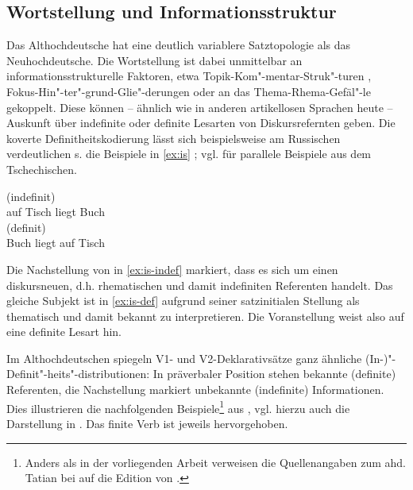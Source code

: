 \subsection{Wortstellung und Informationsstruktur} \label{is-ahd.}

Das Althochdeutsche hat eine deutlich variablere Satztopologie als das Neuhochdeutsche. Die Wortstellung ist dabei unmittelbar an informationsstrukturelle Faktoren, etwa  Topik-Kom"-mentar-Struk"-turen
\parencite{Hinterholzl2005,Ramers2005,Solf2008}, Fokus-Hin"-ter"-grund-Glie"-derungen \parencite{Petrova2009} oder an das Thema-Rhema-Gefäl"-le \parencite{Leiss2000} gekoppelt. Diese können -- ähnlich wie in anderen artikellosen Sprachen heute -- Auskunft über indefinite oder definite Lesarten von Diskursrefernten geben. Die koverte Definitheitskodierung lässt sich beispielsweise am Russischen verdeutlichen s. die Beispiele in \ref{ex:is} \parencite[s.][191]{Szczepaniak2015};  vgl.  \textcite[5]{Leiss2000} für parallele Beispiele aus dem Tschechischen. 

\begin{exe}
	\ex \label{ex:is}   
	\begin{xlist}
		\ex \label{ex:is-indef} 
		\gll {}    (indefinit) \\
		auf Tisch liegt Buch\\
		\trans {}
		\ex \label{ex:is-def} 
		\gll {}    (definit) \\
		Buch liegt auf Tisch\\
		\trans {}
	\end{xlist}
\end{exe}

\noindent
Die Nachstellung von  in \ref{ex:is-indef} markiert, dass es sich um einen diskursneuen, d.h. rhematischen und damit indefiniten Referenten handelt. Das gleiche Subjekt ist in \ref{ex:is-def} aufgrund seiner  satzinitialen Stellung als thematisch und damit bekannt zu interpretieren. Die Voranstellung weist also auf eine definite Lesart hin.

Im Althochdeutschen spiegeln V1- und V2-Deklarativsätze ganz ähnliche (In-)"-Definit"-heits"-distributionen: In präverbaler Position stehen bekannte (definite) Referenten, die Nachstellung markiert unbekannte (indefinite) Informationen. Dies illustrieren die nachfolgenden Beispiele\footnote{Anders als in der vorliegenden Arbeit verweisen die Quellenangaben zum ahd. Tatian bei \textcite{Hinterholzl2010} auf die Edition von \textcite{Masser1994}.} aus \textcite[316]{Hinterholzl2010}, vgl. hierzu auch die Darstellung in \textcite[46f.]{Ferraresi2014}. Das finite Verb ist jeweils hervorgehoben.

